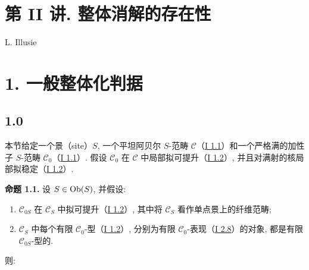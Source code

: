 \section*{第 II 讲. 整体消解的存在性}
\begin{center}
L. Illusie
\end{center}

\section*{1. 一般整体化判据}

\subsection*{1.0}
本节给定一个景（site）$S$, 一个平坦阿贝尔 $S$-范畴 $\mathcal C$（\hyperlink{sga6.e01.sec.1.1}{I 1.1}）和一个严格满的加性子 $S$-范畴 $\mathcal C_0$（\hyperlink{sga6.e01.sec.1.1}{I 1.1}）. 假设 $\mathcal C_0$ 在 $\mathcal C$ 中局部拟可提升（\hyperlink{sga6.e01.sec.1.2}{I 1.2}）, 并且对满射的核局部拟稳定（\hyperlink{sga6.e01.sec.1.2}{I 1.2}）.

\textbf{命题 1.1.} 设 $S\in \operatorname{Ob}(S)$, 并假设:
\begin{enumerate}[label=(\roman*)]
\item $\mathcal C_{0S}$ 在 $\mathcal C_S$ 中拟可提升（\hyperlink{sga6.e01.sec.1.2}{I 1.2}）, 其中将 $\mathcal C_S$ 看作单点景上的纤维范畴;
\item $\mathcal C_S$ 中每个有限 $\mathcal C_0$-型（\hyperlink{sga6.e01.sec.1.2}{I 1.2}）, 分别为有限 $\mathcal C_0$-表现（\hyperlink{sga6.e01.def.2-8}{I 2.8}）的对象, 都是有限 $\mathcal C_{0S}$-型的.
\end{enumerate}
则:

